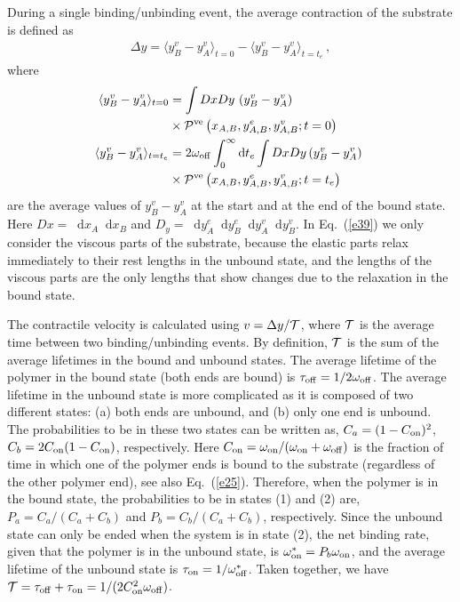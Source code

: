 \documentclass[twocolumn,prl,english]{revtex4-1}
\newcommand*\diff{\mathop{}\!\mathrm{d}}
\begin{document}
During a single binding/unbinding event, the average contraction of the substrate is defined as
\begin{align}
\Delta y  =  \langle y_B^v-y_A^v\rangle _{t=0}-\langle y_B^v-y_A^v\rangle _{t=t_e}\,,
\label{e1}
\end{align} 
where
\begin{align}
\langle y_B^v-y_A^v\rangle _{t=0}&=\int DxDy\, \, (y_B^v-y_A^v)\notag\\&\times{\cal P}^{\rm ve}\left(x_{A,B}, y_{A,B}^e,y_{A,B}^v;t=0\right)\,\notag\\
\langle y_B^v-y_A^v\rangle _{t=t_e}&=2\omega_{\rm off}\int_0^\infty \diff t_e\int DxDy\, (y_B^v-y_A^v)\, \, \notag\\&\times{\cal P}^{\rm ve}\left(x_{A,B}, y_{A,B}^e,y_{A,B}^v;t=t_e\right)\,\,\label{e39}
\end{align} 
are the average values of $y_B^v-y_A^v$ at the start and at the end of the bound state. 
Here $Dx=\diff x_A\diff x_B $ and $D_y=\diff y_A^e\diff y_B^e \diff y_A^v \diff y_B^v$. In Eq.~(\ref{e39}) we only consider the viscous parts of the substrate, because the elastic parts relax immediately to their rest lengths in the unbound state, and the lengths of the viscous parts are the only lengths that show changes due to the relaxation in the bound state. 

The contractile velocity is calculated using $v =  \Delta y/ {\cal T}$, where ${\cal T}$ is the average time between two binding/unbinding events. By definition, ${\cal T}$ is the sum of the average lifetimes in the bound and unbound states. The average lifetime of the polymer in the bound state (both ends are bound) is $\tau_{\rm off}=1/2\omega_{\rm off}$. The average lifetime in the unbound state is more complicated as it is composed of two different states: (a) both ends are unbound, and (b) only one end is unbound. The probabilities to be  in these two states can be written as, $C_a = (1-C_{\rm on})^2$, $C_b = 2C_{\rm on}(1-C_{\rm on})$, respectively. Here $C_{\rm on}=\omega_{\rm on}/(\omega_{\rm on}+\omega_{\rm off})$ is the fraction of time in which one of the polymer ends is bound to the substrate (regardless of the other polymer end), see also Eq.~(\ref{e25}). Therefore, when the polymer is in the bound state, the probabilities to be in states (1) and (2) are, $P_a=C_a/(C_a+C_b)$ and $P_b=C_b/(C_a+C_b)$, respectively. Since the unbound state can only be ended when the system is in state (2), the net binding rate, given that the polymer is in the unbound state, is $\omega^*_{\rm on}=P_b\omega_{\rm on}$, and the average lifetime of the unbound state is $\tau_{\rm on} = 1/\omega^*_{\rm off}$. Taken together, we have ${\cal T} = \tau_{\rm off}+\tau_{\rm on}=1/(2C_{\rm on}^2 \omega_{\rm off})$. 
\end{document}
